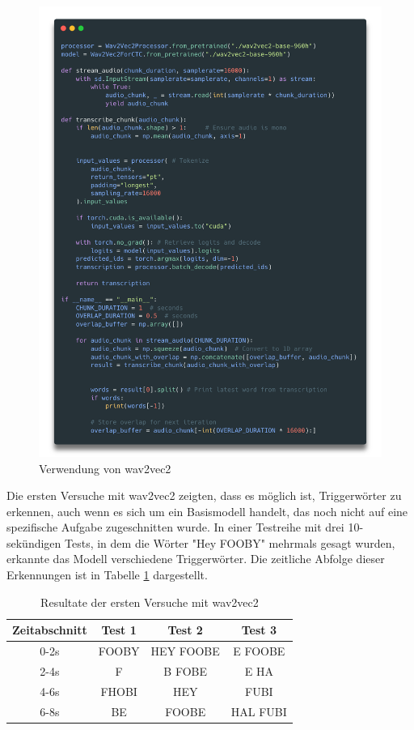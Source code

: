 \documentclass[11pt,a4paper]{article}
\begin{document}
\begin{figure}[h]
	\centering
	\includegraphics[width=0.75\linewidth]{img/wav2vec2_code.png}
	\caption{Verwendung von wav2vec2}
	\label{fig:wav2vec2_code}
\end{figure}

\noindent \newline
Die ersten Versuche mit wav2vec2 zeigten, dass es möglich ist, Triggerwörter zu erkennen, auch 
wenn es sich um ein Basismodell handelt, das noch nicht auf eine spezifische Aufgabe zugeschnitten 
wurde. In einer Testreihe mit drei 10-sekündigen Tests, in dem die Wörter "Hey FOOBY" mehrmals 
gesagt wurden, erkannte das Modell verschiedene Triggerwörter. Die zeitliche Abfolge dieser 
Erkennungen ist in Tabelle \ref{tab:wav2vec2_results} dargestellt.

\begin{table}[H]
	\centering
	\begin{tabular}{|c|c|c|c|}
		\hline
		\textbf{Zeitabschnitt} & \textbf{Test 1} & \textbf{Test 2} & \textbf{Test 3} \\
		\hline
		0-2s & FOOBY & HEY FOOBE & E FOOBE \\
		2-4s & F & B FOBE & E HA \\
		4-6s & FHOBI & HEY & FUBI \\
		6-8s & BE & FOOBE & HAL FUBI\\
		\hline
	\end{tabular}
	\caption{Resultate der ersten Versuche mit wav2vec2}
	\label{tab:wav2vec2_results}
\end{table}
\end{document}
